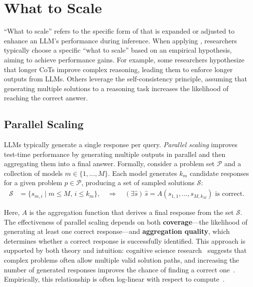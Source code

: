 \section{What to Scale}
\label{sec:what2scale}
``What to scale'' refers to the specific form of \TTS that is expanded or adjusted to enhance an LLM's performance during inference. 
When applying \TTS, researchers typically choose a specific ``what to scale'' based on an empirical hypothesis, aiming to achieve performance gains. For example, some researchers hypothesize that longer CoTs improve complex reasoning, leading them to enforce longer outputs from LLMs. Others leverage the self-consistency principle, assuming that generating multiple solutions to a reasoning task increases the likelihood of reaching the correct answer.

\subsection{Parallel Scaling}
\label{subsec:parallelsclaing}
LLMs typically generate a single response per query. \textit{Parallel scaling} improves test-time performance by generating multiple outputs in parallel and then aggregating them into a final answer. 
Formally, consider a problem set \( \mathcal{P} \) and a collection of models \( m \in \{1, \dots, M\} \). Each model generates \( k_m \) candidate responses for a given problem \( p \in \mathcal{P} \), producing a set of sampled solutions $\mathcal{S}$:
\begin{align}
    \mathcal{S} &= \{ s_{m,i} \mid m \leq M,\, i \leq k_m \},
    \quad \Rightarrow \quad
    \left( \exists \hat{s} \right) \, \hat{s} = A(s_{1,1}, \dots, s_{M,k_M}) \text{ is correct}.
\end{align}

Here, \( A \) is the aggregation function that derives a final response from the set \( \mathcal{S} \). The effectiveness of parallel scaling depends on both \textbf{coverage}—the likelihood of generating at least one correct response—and \textbf{aggregation quality}, which determines whether a correct response is successfully identified.
This approach is supported by both theory and intuition: cognitive science research~\citep{Stanovich_West_2000} suggests that complex problems often allow multiple valid solution paths, and increasing the number of generated responses improves the chance of finding a correct one~\citep{li2025stesttimescaling}. Empirically, this relationship is often log-linear with respect to compute~\citep{brown2024large}.




